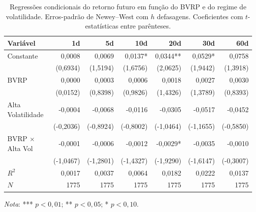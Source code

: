\begin{table}[H]
\centering
\small
\caption{Regressões condicionais do retorno futuro em função do BVRP e do regime de volatilidade.
Erros-padrão de Newey--West com $h$ defasagens. Coeficientes com $t$-estatísticas entre parênteses.}
\label{tab:cap9_regressoes}
\begin{tabular}{lrrrrrr}
\toprule
Variável & 1d & 5d & 10d & 20d & 30d & 60d \\
\midrule
Constante & 0,0008 & 0,0069 & 0,0137* & 0,0344** & 0,0529* & 0,0758 \\
 & (0,6934) & (1,5194) & (1,6756) & (2,0625) & (1,9442) & (1,3918) \\
\addlinespace[2pt]
BVRP & 0,0000 & 0,0003 & 0,0006 & 0,0018 & 0,0027 & 0,0030 \\
 & (0,0152) & (0,8398) & (0,9826) & (1,4326) & (1,3789) & (0,8393) \\
\addlinespace[2pt]
Alta Volatilidade & -0,0004 & -0,0068 & -0,0116 & -0,0305 & -0,0517 & -0,0452 \\
 & (-0,2036) & (-0,8924) & (-0,8002) & (-1,0464) & (-1,1655) & (-0,5850) \\
\addlinespace[2pt]
BVRP $\times$ Alta Vol & -0,0001 & -0,0006 & -0,0012 & -0,0029* & -0,0035 & -0,0010 \\
 & (-1,0467) & (-1,2801) & (-1,4327) & (-1,9290) & (-1,6147) & (-0,3007) \\
\addlinespace[2pt]
\midrule
$R^2$ & 0,0017 & 0,0037 & 0,0064 & 0,0182 & 0,0222 & 0,0137 \\
$N$ & 1775 & 1775 & 1775 & 1775 & 1775 & 1775 \\
\bottomrule
\end{tabular}
\par\smallskip
\footnotesize\textit{Nota}: *** $p<0{,}01$; ** $p<0{,}05$; * $p<0{,}10$.
\end{table}